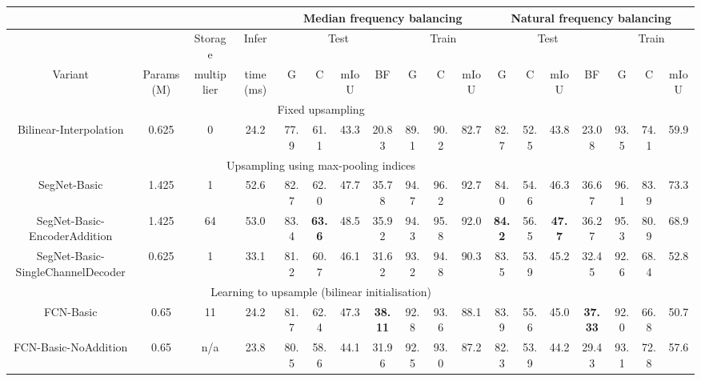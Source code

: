 \documentclass[10pt,journal,compsoc]{IEEEtran}
\begin{document}
\begin{table*}[t]
\footnotesize
\centering
\tabcolsep=1pt
\begin{tabular}{c|c|c|c|cccc|ccc|cccc|ccc}
\multicolumn{4}{c}{} &  \multicolumn{7}{c}{Median frequency balancing} & \multicolumn{7}{|c}{Natural frequency balancing} \\
\hline
& & Storage & Infer & \multicolumn{4}{c|}{Test } &  \multicolumn{3}{c|}{Train } &   \multicolumn{4}{c|}{Test } & \multicolumn{3}{c}{Train }\\
Variant                   &Params (M) &  multiplier   &  time (ms)  & G       & C       & mIoU   &BF     &  G & C & mIoU   & G & C & mIoU  & BF & G & C & \multicolumn{1}{c}{mIoU}               \\ \hline \hline
\multicolumn{16}{c}{Fixed upsampling} \\ \hline
Bilinear-Interpolation           & 0.625 & 0 & 24.2 & 77.9 & 61.1 & 43.3 &20.83 & 89.1 & 90.2 &  82.7     & 82.7 & 52.5 & 43.8 &23.08 &93.5&74.1 &         59.9 \\ \hline                                                                                                   
\multicolumn{16}{c}{Upsampling using max-pooling indices}    \\                                                                                              
 \hline
SegNet-Basic                    & 1.425 & 1 & 52.6 & 82.7       &   62.0      &   47.7  &35.78  & 94.7 & 96. 2 & 92.7 &  84.0 & 54.6 & 46.3 & 36.67 & 96.1 & 83.9 &73.3                   \\ \hline
SegNet-Basic-EncoderAddition    &1.425 & 64  & 53.0 & 83.4  &     \textbf{63.6 }   &      48.5    &35.92    & 94.3 &  95.8 &  92.0 & \textbf{84.2} & 56.5 & \textbf{47.7} & 36.27 & 95.3&80.9 & 68.9\\ \hline
SegNet-Basic-SingleChannelDecoder& 0.625 &  1 & 33.1 &  81.2     &    60.7     &     46.1   & 31.62     & 93.2 & 94.8 &   90.3  & 83.5 & 53.9 & 45.2 & 32.45 &92.6 & 68.4 & 52.8        \\ \hline
\multicolumn{16}{c}{Learning to upsample (bilinear initialisation)}                                                                                                         
 \\ \hline
FCN-Basic                     & 0.65 & 11  & 24.2  &   81.7    &     62.4    &    47.3  &\textbf{38.11}      & 92.8 & 93.6 &  88.1  & 83.9 & 55.6 & 45.0 & \textbf{37.33} & 92.0 & 66.8 & 50.7       \\ \hline
FCN-Basic-NoAddition           &0.65 & n/a & 23.8 &   80.5    &    58.6     &     44.1    &31.96     & 92.5 & 93.0 &    87.2 & 82.3 & 53.9 & 44.2 & 29.43 &93.1& 72.8 & 57.6         \\ \hline

\end{tabular}
\end{table*}
\end{document}
